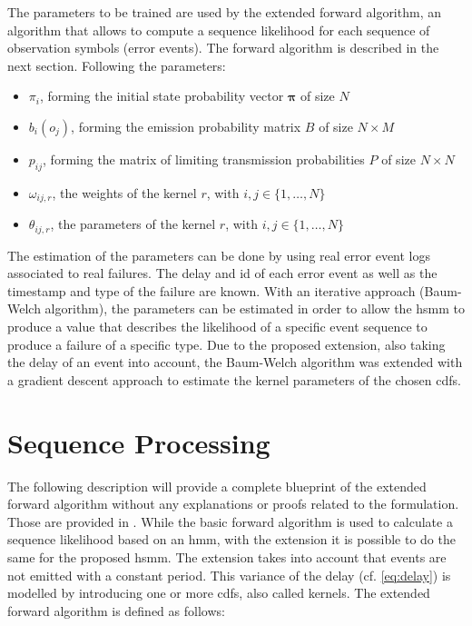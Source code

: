 \documentclass[mscthesis]{usiinfthesis}
\begin{document}
The parameters to be trained are used by the extended forward algorithm, an
algorithm that allows to compute a sequence likelihood for each sequence of
observation symbols (error events). The forward algorithm is described in
the next section. Following the parameters:
\begin{itemize}
    \item $ \pi_i $, forming the initial state probability vector
        $ \boldsymbol{\pi} $ of size $ N $
    \item $ b_i(o_j) $, forming the emission probability matrix $ B $ of size
        $ N \times M $
    \item $ p_{ij} $, forming the matrix of limiting transmission probabilities
        $ P $ of size $ N \times N $
    \item $ \omega_{ij, r} $, the weights of the kernel $ r $, with
        $i,j \in \{1, \dots, N\} $
    \item $ \theta_{ij, r} $, the parameters of the kernel $ r $, with
        $i,j \in \{1, \dots, N\} $
\end{itemize}

The estimation of the parameters can be done by using real error event logs
associated to real failures. The delay and id of each error event as well as
the timestamp and type of the failure are known. With an iterative approach
(Baum-Welch algorithm), the parameters can be estimated in order to allow the
\gls{hsmm} to produce a value that describes the likelihood of a specific event
sequence to produce a failure of a specific type. Due to the proposed extension,
also taking the delay of an event into account, the Baum-Welch algorithm was
extended with a gradient descent approach to estimate the kernel parameters of
the chosen \glspl{cdf}.

\section{Sequence Processing}
\label{ch:event_sequ}

The following description will provide a complete blueprint of the extended
forward algorithm without any explanations or proofs related to the
formulation. Those are provided in \cite{salfner08}. While the basic forward
algorithm is used to calculate a sequence likelihood based on an \gls{hmm}, with
the extension it is possible to do the same for the proposed \gls{hsmm}. The
extension takes into account that events are not emitted with a constant
period. This variance of the delay (cf. \ref{eq:delay}) is modelled by
introducing one or more \glspl{cdf}, also called kernels. The extended forward
algorithm is defined as follows:
\end{document}
